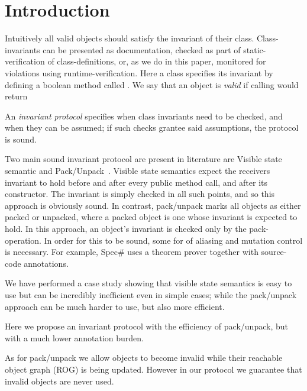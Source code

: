 \section{Introduction}
Intuitively all valid objects should satisfy the invariant of their class.
Class-invariants can be presented as documentation, checked as part of static-verification of class-definitions, or, as we do in this paper, monitored for violations using runtime-verification.
Here a class specifies its invariant by defining a boolean method called \Q@invariant@. We say that an object is \emph{valid} if calling \Q@invariant@ would return \Q@true@ 

An \emph{invariant protocol} specifies when class invariants need to be checked, and when they can be assumed; if such checks grantee said assumptions, the protocol is sound.


Two main sound invariant protocol are present in literature are Visible state semantic \cite{??} and Pack/Unpack~\cite{}.
Visible state semantics expect the receivers invariant to hold before and after every public method call, and after its constructor. The invariant is simply checked in all such points, and so this approach is obviously sound.
In contrast, pack/unpack marks all objects as either packed or unpacked, where a packed object is one whose invariant is expected to hold.
In this approach, an object's invariant is checked only by the pack-operation.
In order for this to be sound, some for of aliasing and mutation control is necessary. For example, Spec\# uses a theorem prover together with source-code annotations.

We have performed a case study showing that visible state semantics is easy to use but can be incredibly inefficient even in simple cases; while the pack/unpack approach can be much harder to use, but also more efficient.


Here we propose an invariant protocol with the 
efficiency of pack/unpack, but with a much lower annotation burden.

As for pack/unpack we allow objects to become invalid while their reachable object graph (ROG) is being updated. However in our protocol we guarantee 
that invalid objects are never used.

